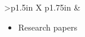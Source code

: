 \documentclass[8pt]{extarticle}
\begin{document}
\begin{tabularx}{\linewidth}{>{\bfseries}p{1.5in} X p{1.75in}}
                                                            &   \begin{minipage}[t]{\linewidth}
                                                                \begin{itemize}[nosep,leftmargin=*]
                                                                    \item Research papers
                                                                \end{itemize}
                                                                \end{minipage}
                                                                        \\
    
    \bottomrule
\end{tabularx}
\end{document}
